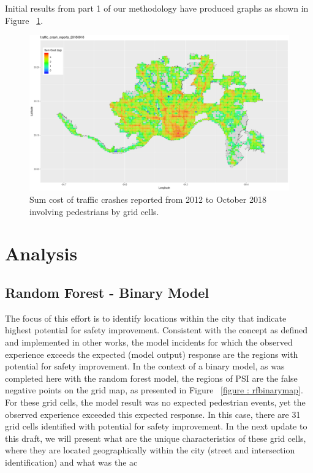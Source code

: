 \documentclass{llncs}
\begin{document}
Initial results from part 1 of our methodology have produced graphs as shown in Figure ~\ref{figure:SumCrashPlot}. \newline
\FloatBarrier
\begin{figure}
 	\includegraphics[width=\textwidth, height=\textheight, keepaspectratio]{TrafficCrashReports20180918SumCostMapped2Grid.png}
 	\caption{Sum cost of traffic crashes reported from 2012 to October 2018 involving pedestrians by grid cells.}
	\label{figure:SumCrashPlot}
\end{figure}
\FloatBarrier
%
\section{Analysis}
%
\subsection{Random Forest - Binary Model}

The focus of this effort is to identify locations within the city that indicate highest potential for safety improvement. Consistent with the concept as defined and implemented in other works, the model incidents for which the observed experience exceeds the expected (model output) response are the regions with potential for safety improvement. In the context of a binary model, as was completed here with the random forest model, the regions of PSI are the false negative points on the grid map, as presented in Figure ~\ref{figure : rfbinarymap}. For these grid cells, the model result was no expected pedestrian events, yet the observed experience exceeded this expected response. In this case, there are 31 grid cells identified with potential for safety improvement. In the next update to this draft, we will present what are the unique characteristics of these grid cells, where they are located geographically within the city (street and intersection identification) and what was the ac
%
\end{document}
